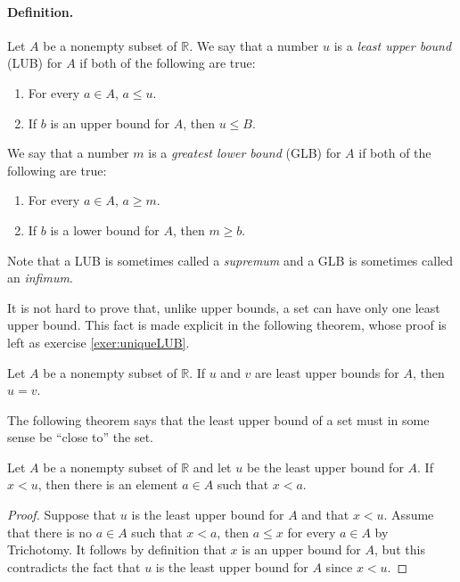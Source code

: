 \paragraph{Definition.} Let $A$ be a nonempty subset of $\mathbb R$. We say that a number $u$ is a \emph{least upper bound} (LUB)  for $A$ if both of the following are true:
\begin{enumerate}
\item For every $a\in A$, $a\leq u$.
\item If $b$ is an upper bound for $A$, then $u\leq B$.
\end{enumerate}
We say that a number $m$ is a \emph{greatest lower bound} (GLB) for $A$ if both of the following are true:
\begin{enumerate}
\item For every $a\in A$, $a\geq m$.
\item If $b$ is a lower bound for $A$, then $m\geq b$.
\end{enumerate}
Note that a LUB is sometimes called a \emph{supremum} and a GLB is sometimes called an \emph{infimum}.

It is not hard to prove that, unlike upper bounds, a set can have only one least upper bound. This fact is made explicit in the following theorem, whose proof is left as exercise \ref{exer:uniqueLUB}.

\begin{thrm} \label{thrm:uniquelub}
Let $A$ be a nonempty subset of $\mathbb R$. If $u$ and $v$ are least upper bounds for $A$, then $u=v$.
\end{thrm}

The following theorem says that the least upper bound of a set must in some sense be ``close to'' the set.

\begin{thrm} \label{thrm:lubclose}
Let $A$ be a nonempty subset of $\mathbb R$ and let $u$ be the least upper bound for $A$. If $x<u$, then there is an element $a\in A$ such that $x<a$.
\end{thrm}

\begin{proof}
Suppose that $u$ is the least upper bound for $A$ and that $x<u$. Assume that there is no $a\in A$ such that $x<a$, then $a\leq x$ for every $a\in A$ by Trichotomy. It follows by definition that $x$ is an upper bound for $A$, but this contradicts the fact that $u$ is the least upper bound for $A$ since $x<u$.
\end{proof}


